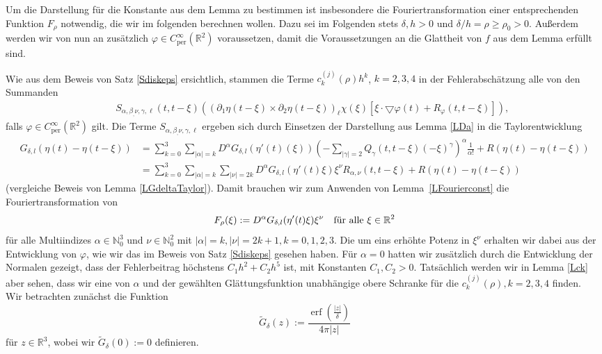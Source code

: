 \documentclass[12pt,a4paper]{scrartcl}
\numberwithin{equation}{section}
\newcommand{\R}{\mathbb{R}} %
\newcommand{\N}{\mathbb{N}} %
\newcommand{\grad}{\bigtriangledown}
\newcommand{\per}{\operatorname{per}}
\newcommand{\erf}{\operatorname{erf}}
\newcommand{\fa}{\text{\quad für alle }}
\begin{document}
Um die Darstellung für die Konstante aus dem Lemma zu bestimmen ist insbesondere die Fouriertransformation einer entsprechenden Funktion $F_\rho$ notwendig, die wir im folgenden berechnen wollen. Dazu sei im Folgenden stets $\delta,h>0$ und $\delta/h= \rho \geq \rho_0 >0$. Außerdem werden wir von nun an zusätzlich $\varphi \in C_{\per}^\infty(\R^2)$ voraussetzen, damit die Voraussetzungen an die Glattheit von $f$ aus dem Lemma erfüllt sind.

Wie aus dem Beweis von Satz \ref{Sdiskeps} ersichtlich, stammen die Terme $c_k^{(j)}(\rho) h^k$, $k=2,3,4$ in der Fehlerabschätzung alle von den Summanden
\begin{align*}
&&S_{\alpha,\beta_,\nu,\gamma,\ell}(t,t-\xi)\left((\partial_1 \eta (t-\xi) \times \partial_2 \eta(t-\xi))_\ell\chi(\xi)\left[\xi \cdot \grad\varphi(t) + R_\varphi(t,t-\xi) \right] \right),
\end{align*}  
falls $\varphi \in C_{\per}^\infty(\R^2)$ gilt.
Die Terme $S_{\alpha,\beta_,\nu,\gamma,\ell}$ ergeben sich durch Einsetzen der Darstellung aus Lemma \ref{LDa} in die Taylorentwicklung
\begin{align*}
G_{\delta,l}(\eta(t)-\eta(t-\xi)) &= \sum_{k=0}^3 \sum_{|\alpha|=k} D^\alpha G_{\delta,l}(\eta'(t)(\xi))(- \sum_{|\gamma|=2}Q_\gamma (t,t-\xi) (-\xi)^\gamma)^\alpha \frac{1}{\alpha!} + R(\eta(t)-\eta(t-\xi)) \\
&= \sum_{k=0}^3 \sum_{|\alpha|=k}\sum_{|\nu|=2k}  D^\alpha G_{\delta,l}(\eta'(t)\xi) \xi^\nu R_{\alpha,\nu}(t,t-\xi) +  R(\eta(t)-\eta(t-\xi))
\end{align*} (vergleiche Beweis von Lemma \ref{LGdeltaTaylor}). Damit brauchen wir zum Anwenden von Lemma~\ref{LFourierconst} die Fouriertransformation von
\[
F_\rho(\xi):= D^\alpha G_{\delta,l}(\eta'(t)\xi) \xi^\nu \fa \xi \in \R^2
\]
für alle Multiindizes $\alpha \in \N_0^3$ und $\nu\in \N_0^2$ mit $|\alpha|=k , |\nu|=2k+1, k=0,1,2,3$. Die um eins erhöhte Potenz in $\xi^\nu$ erhalten wir dabei aus der Entwicklung von $\varphi$, wie wir das im Beweis von Satz \ref{Sdiskeps} gesehen haben. Für $\alpha=0$ hatten wir zusätzlich durch die Entwicklung der Normalen gezeigt, dass der Fehlerbeitrag höchstens $C_1 h^2+C_2 h^5$ ist, mit Konstanten $C_1,C_2>0$. Tatsächlich werden wir in Lemma \ref{Lck} aber sehen, dass wir eine von $\alpha$ und der gewählten Glättungsfunktion unabhängige obere Schranke für die $c_k^{(j)}(\rho), k=2,3,4$ finden.
\\
Wir betrachten zunächst die Funktion 
\[
\widetilde G_\delta (z):= \frac{\erf\left(\frac{|z|}{\delta}\right)}{4 \pi |z|}
\]
für $z \in\R^3$, wobei wir $\widetilde G_\delta (0):=0$ definieren. 
\end{document}
